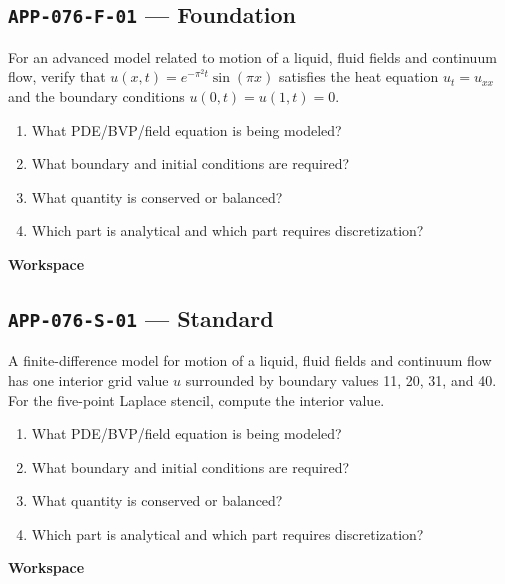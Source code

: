 \documentclass[11pt]{book}
\newcommand{\pid}[1]{\texttt{#1}}
\newcommand{\workspace}{\par\vspace{0.7in}\hrulefill\par\vspace{0.55in}\hrulefill\par}
\begin{document}
\subsection*{\pid{APP-076-F-01} — Foundation}
\begin{problembox}
For an advanced model related to motion of a liquid, fluid fields and continuum flow, verify that $u(x,t)=e^{-\pi^2t}\sin(\pi x)$ satisfies the heat equation $u_t=u_{xx}$ and the boundary conditions $u(0,t)=u(1,t)=0$.
\end{problembox}
\begin{promptbox}\begin{enumerate}
\item What PDE/BVP/field equation is being modeled?
\item What boundary and initial conditions are required?
\item What quantity is conserved or balanced?
\item Which part is analytical and which part requires discretization?
\end{enumerate}\end{promptbox}
\textbf{Workspace}\workspace
{}
\subsection*{\pid{APP-076-S-01} — Standard}
\begin{problembox}
A finite-difference model for motion of a liquid, fluid fields and continuum flow has one interior grid value $u$ surrounded by boundary values 11, 20, 31, and 40. For the five-point Laplace stencil, compute the interior value.
\end{problembox}
\begin{promptbox}\begin{enumerate}
\item What PDE/BVP/field equation is being modeled?
\item What boundary and initial conditions are required?
\item What quantity is conserved or balanced?
\item Which part is analytical and which part requires discretization?
\end{enumerate}\end{promptbox}
\textbf{Workspace}\workspace
{}
\end{document}
